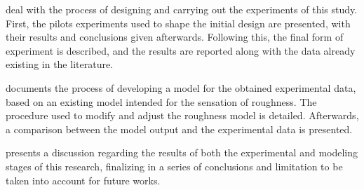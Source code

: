 \documentclass[../main.tex]{subfiles}
\begin{document}
 deal with the process of designing and carrying
out the experiments of this study. First, the pilots experiments used to shape
the initial design are presented, with their results and conclusions given
afterwards. Following this, the final form of experiment is described, and the
results are reported along with the data already existing in the literature.

 documents the process of developing a model for the obtained
experimental data, based on an existing model intended for the sensation of
roughness. The procedure used to modify and adjust the roughness model is
detailed. Afterwards, a comparison between the model output and the
experimental data is presented.

 presents a discussion regarding the results of both the
experimental and modeling stages of this research, finalizing in a series of
conclusions and limitation to be taken into account for future works.
\end{document}
